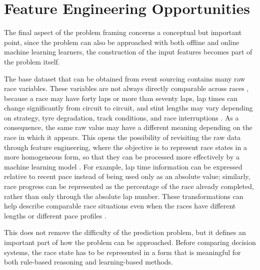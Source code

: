 \section{Feature Engineering Opportunities}

The final aspect of the problem framing concerns a conceptual but important point, 
since the problem can also be approached with both offline and online machine learning learners, the construction of the input features becomes part of the problem itself.

The base dataset that can be obtained from event sourcing contains many raw race variables. 
These variables are not always directly comparable across races \citep{roberts2017cvstructured,heilmeier2020race}, because
a race may have forty laps or more than seventy laps, lap times can change significantly from circuit to circuit, and stint lengths may vary depending on strategy, tyre degradation,
track conditions, and race interruptions \citep{heilmeier2020race,cappello2025statespace}. 
As a consequence, the same raw value may have a different meaning depending on the race in which it appears.
This opens the possibility of revisiting the raw data through feature engineering, 
where the objective is to represent race states in a more homogeneous form, so that they can be processed more effectively by a machine learning model \citep{chen2016xgboost,hettmann2024datatopodium,dinh2025gradient}. 
For example, lap time information can be expressed relative to recent pace instead of being used only as an absolute value; 
similarly, race progress can be represented as the percentage of the race already completed, rather than only through the absolute lap number. 
These transformations can help describe comparable race situations even when the races have different lengths or different pace profiles \citep{roberts2017cvstructured,cappello2025statespace}.

This does not remove the difficulty of the prediction problem, but it defines an important part of how the problem can be approached. 
Before comparing decision systems, the race state has to be represented in a form that is meaningful for both rule-based reasoning and learning-based methods.

